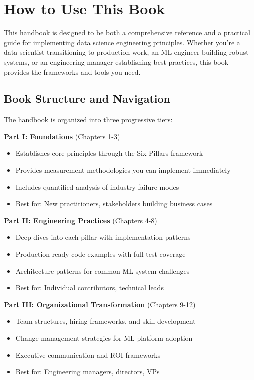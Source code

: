 \section{How to Use This Book}

This handbook is designed to be both a comprehensive reference and a practical guide for implementing data science engineering principles. Whether you're a data scientist transitioning to production work, an ML engineer building robust systems, or an engineering manager establishing best practices, this book provides the frameworks and tools you need.

\subsection{Book Structure and Navigation}

The handbook is organized into three progressive tiers:

\textbf{Part I: Foundations} (Chapters 1-3)
\begin{itemize}
    \item Establishes core principles through the Six Pillars framework
    \item Provides measurement methodologies you can implement immediately
    \item Includes quantified analysis of industry failure modes
    \item Best for: New practitioners, stakeholders building business cases
\end{itemize}

\textbf{Part II: Engineering Practices} (Chapters 4-8)
\begin{itemize}
    \item Deep dives into each pillar with implementation patterns
    \item Production-ready code examples with full test coverage
    \item Architecture patterns for common ML system challenges
    \item Best for: Individual contributors, technical leads
\end{itemize}

\textbf{Part III: Organizational Transformation} (Chapters 9-12)
\begin{itemize}
    \item Team structures, hiring frameworks, and skill development
    \item Change management strategies for ML platform adoption
    \item Executive communication and ROI frameworks
    \item Best for: Engineering managers, directors, VPs
\end{itemize}

